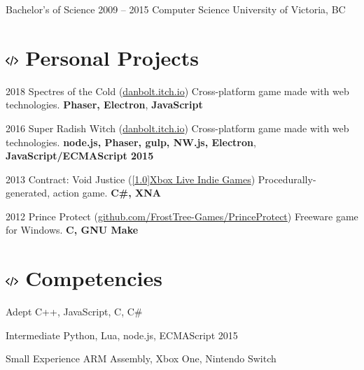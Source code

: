 \documentclass[10pt]{tccv}
\begin{document}
\begin{yearlist}

\item[Bachelor's of Science]{2009 -- 2015}
     {Computer Science}
     {University of Victoria, BC}

\end{yearlist}

\section{\includegraphics[height=10pt, keepaspectratio=true]{code} Personal Projects}

\begin{yearlist}

\item{2018}
     {Spectres of the Cold (\href{https://danbolt.itch.io/spectres-of-the-cold}{danbolt.itch.io})}
     {Cross-platform game made with web technologies. \textbf{Phaser, Electron}, \textbf{JavaScript}}
     
\item{2016}
     {Super Radish Witch (\href{http://danbolt.itch.io/superradishwitch}{danbolt.itch.io})}
     {Cross-platform game made with web technologies. \textbf{node.js, Phaser, gulp, NW.js, Electron}, \textbf{JavaScript/ECMAScript 2015}}

\item{2013}
     {Contract: Void Justice (\href{http://marketplace.xbox.com/en-US/Product/Contract-Void-Justice/66acd000-77fe-1000-9115-d80258550d94}{\scalebox{.8}[1.0]{Xbox Live Indie Games}})}
     {Procedurally-generated, action game. \textbf{C\#, XNA}}

\item{2012}
     {Prince Protect (\href{https://github.com/FrostTree-Games/PrinceProtect}{github.com/FrostTree-Games/PrinceProtect})}
     {Freeware game for Windows. \textbf{C, GNU Make}}

\end{yearlist}

\section{\includegraphics[height=10pt, keepaspectratio=true]{code} Competencies}

\begin{factlist}

\item{Adept}
     {C++, JavaScript, C, C\#}
     
\item{Intermediate}
	 {Python, Lua, node.js, ECMAScript 2015}

\item{Small Experience}
     {ARM Assembly, Xbox One, Nintendo Switch}

\end{factlist}
\end{document}

